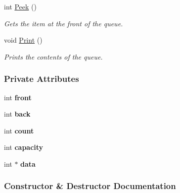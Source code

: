 \begin{DoxyCompactItemize}
int \hyperlink{class_array_queue_af172b2c16eb4754b57c758d239779beb}{Peek} ()
\begin{DoxyCompactList}\small\item\em Gets the item at the front of the queue. \end{DoxyCompactList}\item 
void \hyperlink{class_array_queue_a42d0098225feae1632a03539f6485aa8}{Print} ()
\begin{DoxyCompactList}\small\item\em Prints the contents of the queue. \end{DoxyCompactList}\end{DoxyCompactItemize}
\subsubsection*{Private Attributes}
\begin{DoxyCompactItemize}
\item 
int {\bfseries front}\hypertarget{class_array_queue_a2091ceed1828edc21eafb99391bcf779}{}\label{class_array_queue_a2091ceed1828edc21eafb99391bcf779}

\item 
int {\bfseries back}\hypertarget{class_array_queue_a695304cdb4b43f6ad7f39a08d81964fb}{}\label{class_array_queue_a695304cdb4b43f6ad7f39a08d81964fb}

\item 
int {\bfseries count}\hypertarget{class_array_queue_acedff7982247f93ced73015cc7dcae96}{}\label{class_array_queue_acedff7982247f93ced73015cc7dcae96}

\item 
int {\bfseries capacity}\hypertarget{class_array_queue_a61798dbbcea2435f97d09a72ecd4e571}{}\label{class_array_queue_a61798dbbcea2435f97d09a72ecd4e571}

\item 
int $\ast$ {\bfseries data}\hypertarget{class_array_queue_a709a3b76e1d0d6d2912519dc7edaa0c3}{}\label{class_array_queue_a709a3b76e1d0d6d2912519dc7edaa0c3}

\end{DoxyCompactItemize}


\subsubsection{Constructor \& Destructor Documentation}
